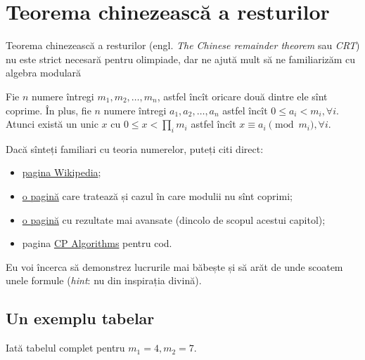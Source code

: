 \documentclass[../main.tex]{subfiles}
\begin{document}
\chapter{Teorema chinezească a resturilor}

Teorema chinezească a resturilor (engl. \textit{The Chinese remainder theorem} sau \textit{CRT}) nu este strict necesară pentru olimpiade, dar ne ajută mult să ne familiarizăm cu algebra modulară

\begin{theorem}
  Fie $n$ numere întregi $m_1, m_2, \dots, m_n$, astfel încît oricare două dintre ele sînt coprime. În plus, fie $n$ numere întregi $a_1, a_2, \dots, a_n$ astfel încît $0 \leq a_i < m_i, \forall i$. Atunci există un unic $x$ cu $0 \leq x < \prod_{i} m_i$ astfel încît $x \equiv a_i \pmod{m_i}, \forall i$.
\end{theorem}

Dacă sînteți familiari cu teoria numerelor, puteți citi direct:

\begin{itemize}
  \item \href{https://en.wikipedia.org/wiki/Chinese_remainder_theorem}{pagina Wikipedia};

  \item \href{https://sites.millersville.edu/bikenaga/number-theory/chinese-remainder-theorem/chinese-remainder-theorem.html}{o pagină} care tratează și cazul în care modulii nu sînt coprimi;

  \item \href{https://kconrad.math.uconn.edu/blurbs/ugradnumthy/crt.pdf}{o pagină} cu rezultate mai avansate (dincolo de scopul acestui capitol);

  \item pagina \href{https://cp-algorithms.com/algebra/chinese-remainder-theorem.html}{CP Algorithms} pentru cod.
\end{itemize}

Eu voi încerca să demonstrez lucrurile mai băbește și să arăt de unde scoatem unele formule (\textit{hint}: nu din inspirația divină).

\section{Un exemplu tabelar}

Iată tabelul complet pentru $m_1 = 4, m_2 = 7$.
\end{document}
